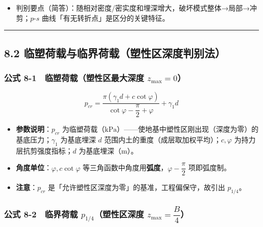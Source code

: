 \documentclass[
]{article}
\providecommand{\tightlist}{%
  \setlength{\itemsep}{0pt}\setlength{\parskip}{0pt}}
\begin{document}
\begin{itemize}
\tightlist
\item
  判别要点（简答）：随相对密度/密实度和埋深增大，破坏模式整体→局部→冲剪；\(p\)-\(s\)
  曲线「有无转折点」是区分的关键特征。
\end{itemize}

\begin{center}\rule{0.5\linewidth}{0.5pt}\end{center}

\subsection{8.2
临塑荷载与临界荷载（塑性区深度判别法）}\label{ux4e34ux5851ux8377ux8f7dux4e0eux4e34ux754cux8377ux8f7dux5851ux6027ux533aux6df1ux5ea6ux5224ux522bux6cd5}

\subsubsection{\texorpdfstring{公式 8-1　临塑荷载（塑性区最大深度
\(z_{\max}=0\)）}{公式 8-1　临塑荷载（塑性区最大深度 z\_\{\textbackslash max\}=0）}}\label{ux516cux5f0f-8-1-ux4e34ux5851ux8377ux8f7dux5851ux6027ux533aux6700ux5927ux6df1ux5ea6-z_max0}

\[\boxed{p_{cr}=\frac{\pi\left(\gamma_1 d+c\cot\varphi\right)}{\cot\varphi-\dfrac{\pi}{2}+\varphi}+\gamma_1 d}\]

\begin{itemize}
\tightlist
\item
  \textbf{参数说明}：\(p_{cr}\)
  为临塑荷载（\(\mathrm{kPa}\)）------使地基中塑性区刚出现（深度为零）的基底压力；\(\gamma_1\)
  为基底埋深 \(d\) 范围内土的重度（成层取加权平均）；\(c,\varphi\)
  为持力层抗剪强度指标；\(d\) 为基底埋深（m）。
\item
  \textbf{角度单位}：\(\varphi,c\cot\varphi\)
  等三角函数中角度用\textbf{弧度}，\(\varphi-\dfrac{\pi}{2}\)
  项即弧度制。
\item
  \textbf{注意}：\(p_{cr}\)
  是「允许塑性区深度为零」的基准，工程偏保守，故引出 \(p_{1/4}\)。
\end{itemize}

\subsubsection{\texorpdfstring{公式 8-2　临界荷载
\(p_{1/4}\)（塑性区深度
\(z_{\max}=\dfrac{B}{4}\)）}{公式 8-2　临界荷载 p\_\{1/4\}（塑性区深度 z\_\{\textbackslash max\}=\textbackslash dfrac\{B\}\{4\}）}}\label{ux516cux5f0f-8-2-ux4e34ux754cux8377ux8f7d-p_14ux5851ux6027ux533aux6df1ux5ea6-z_maxdfracb4}
\end{document}
